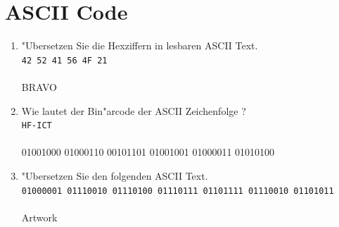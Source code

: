 \documentclass[a4paper,10pt]{article}
\begin{document}
\section{ASCII Code}

\begin{enumerate}
\item "Ubersetzen Sie die Hexziffern in lesbaren ASCII Text.\\
\verb|42 52 41 56 4F 21| \\ \\ %
	 {\color{ForestGreen}
		 BRAVO \\
	 }

\item Wie lautet der Bin"arcode der ASCII Zeichenfolge ? \\
\verb|HF-ICT| \\ \\ %
	 {\color{ForestGreen}
		 01001000 01000110 00101101 01001001 01000011 01010100 \\
	 }

\item "Ubersetzen Sie den folgenden ASCII Text.\\
\verb|01000001 01110010 01110100 01110111 01101111 01110010 01101011| \\ \\ %
	 {\color{ForestGreen}
		 Artwork \\
	 }
\end{enumerate}
\end{document}
